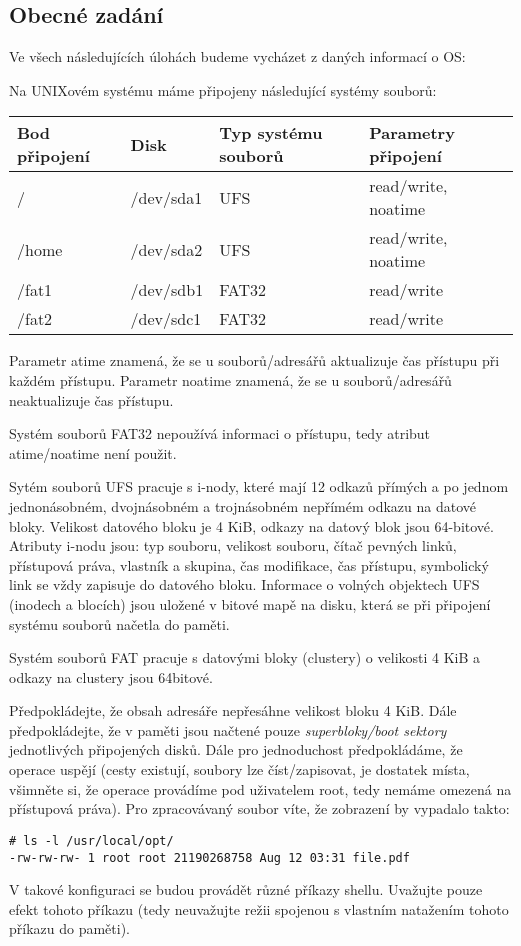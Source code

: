 \subsection{Obecné zadání}
Ve všech následujících úlohách budeme vycházet z daných informací o OS:

Na UNIXovém systému máme připojeny následující systémy souborů:
\begin{table}[h]
    \centering
    \begin{tabular}{ l|l|l|l }
        \hline
        Bod připojení & Disk & Typ systému souborů & Parametry připojení\\
        \hline
        / & /dev/sda1 & UFS & read/write, noatime\\
        /home & /dev/sda2 & UFS & read/write, noatime\\
        /fat1 & /dev/sdb1 & FAT32 & read/write\\
        /fat2 & /dev/sdc1 & FAT32 & read/write\\
        \hline
    \end{tabular}
\end{table} 

Parametr atime znamená, že se u souborů/adresářů aktualizuje čas přístupu při každém přístupu. Parametr noatime znamená, že se u souborů/adresářů neaktualizuje čas přístupu.

Systém souborů FAT32 nepoužívá informaci o přístupu, tedy atribut atime/noatime není použit.

Sytém souborů UFS pracuje s i-nody, které mají 12 odkazů přímých a po jednom jednonásobném, dvojnásobném a trojnásobném nepřímém odkazu na datové bloky. Velikost datového bloku je 4 KiB, odkazy na datový blok jsou 64-bitové. Atributy i-nodu jsou: typ souboru, velikost souboru, čítač pevných linků, přístupová práva, vlastník a skupina, čas modifikace, čas přístupu, symbolický link se vždy zapisuje do datového bloku. Informace o volných objektech UFS (inodech a blocích) jsou uložené v bitové mapě na disku, která se při připojení systému souborů načetla do paměti.

Systém souborů FAT pracuje s datovými bloky (clustery) o velikosti 4 KiB a odkazy na clustery jsou 64bitové.

Předpokládejte, že obsah adresáře nepřesáhne velikost bloku 4 KiB. Dále předpokládejte, že v paměti jsou načtené pouze \textit{superbloky/boot sektory} jednotlivých připojených disků. Dále pro jednoduchost předpokládáme, že operace uspějí (cesty existují, soubory lze číst/zapisovat, je dostatek místa, všimněte si, že operace provádíme pod uživatelem root, tedy nemáme omezená na přístupová práva). Pro zpracovávaný soubor víte, že zobrazení by vypadalo takto:

\begin{verbatim}
# ls -l /usr/local/opt/
-rw-rw-rw- 1 root root 21190268758 Aug 12 03:31 file.pdf
\end{verbatim}

V takové konfiguraci se budou provádět různé příkazy shellu. Uvažujte pouze efekt tohoto příkazu (tedy neuvažujte režii spojenou s vlastním natažením tohoto příkazu do paměti).
